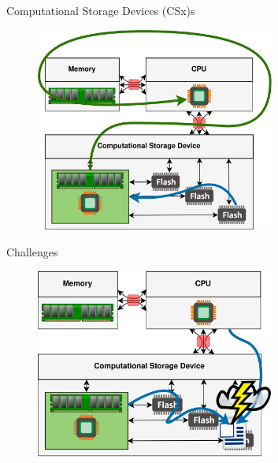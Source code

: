 \documentclass{beamer}
\begin{document}
\begin{frame}{Computational Storage Devices (CSx)s}
	\begingroup
	\small
	\begin{figure}
		\centering
		\includegraphics[width=0.7\textwidth]{resources/images/csd.png}
	\end{figure}
	\endgroup
\end{frame}

\begin{frame}{Challenges}
	\begingroup
	\small
	\begin{figure}
		\centering
		\includegraphics[width=0.7\textwidth]{resources/images/challenges.png}
	\end{figure}
	\endgroup
\end{frame}
\end{document}
